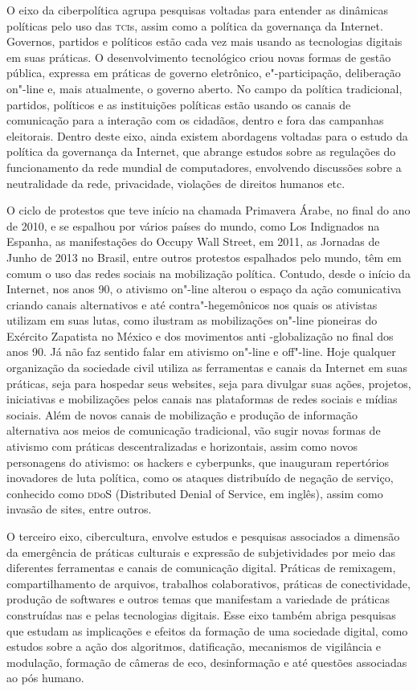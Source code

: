 O eixo da ciberpolítica agrupa pesquisas voltadas para entender as
dinâmicas políticas pelo uso das \textsc{tci}s, assim como a política da
governança da Internet. Governos, partidos e políticos estão cada vez
mais usando as tecnologias digitais em suas práticas. O desenvolvimento
tecnológico criou novas formas de gestão pública, expressa em práticas
de governo eletrônico, e"-participação, deliberação on"-line e, mais
atualmente, o governo aberto. No campo da política tradicional,
partidos, políticos e as instituições políticas estão usando os canais
de comunicação para a interação com os cidadãos, dentro e fora das
campanhas eleitorais. Dentro deste eixo, ainda existem abordagens
voltadas para o estudo da política da governança da Internet, que
abrange estudos sobre as regulações do funcionamento da rede mundial de
computadores, envolvendo discussões sobre a neutralidade da rede,
privacidade, violações de direitos humanos etc.

O ciclo de protestos que teve início na chamada Primavera Árabe, no
final do ano de 2010, e se espalhou por vários países do mundo, como Los
Indignados na Espanha, as manifestações do Occupy Wall Street, em 2011,
as Jornadas de Junho de 2013 no Brasil, entre outros protestos
espalhados pelo mundo, têm em comum o uso das redes sociais na
mobilização política. Contudo, desde o início da Internet, nos anos 90,
o ativismo on"-line alterou o espaço da ação comunicativa criando canais
alternativos e até contra"-hegemônicos nos quais os ativistas utilizam em
suas lutas, como ilustram as mobilizações on"-line pioneiras do Exército
Zapatista no México e dos movimentos anti -globalização no final dos
anos 90. Já não faz sentido falar em ativismo on"-line e off"-line. Hoje
qualquer organização da sociedade civil utiliza as ferramentas e canais
da Internet em suas práticas, seja para hospedar seus websites, seja
para divulgar suas ações, projetos, iniciativas e mobilizações pelos
canais nas plataformas de redes sociais e mídias sociais. Além de novos
canais de mobilização e produção de informação alternativa aos meios de
comunicação tradicional, vão sugir novas formas de ativismo com práticas
descentralizadas e horizontais, assim como novos personagens do
ativismo: os hackers e cyberpunks, que inauguram repertórios inovadores
de luta política, como os ataques distribuído de negação de serviço,
conhecido como \textsc{dd}oS (Distributed Denial of Service, em inglês), assim
como invasão de sites, entre outros.

O terceiro eixo, cibercultura, envolve estudos e pesquisas associados a
dimensão da emergência de práticas culturais e expressão de
subjetividades por meio das diferentes ferramentas e canais de
comunicação digital. Práticas de remixagem, compartilhamento de
arquivos, trabalhos colaborativos, práticas de conectividade, produção
de softwares e outros temas que manifestam a variedade de práticas
construídas nas e pelas tecnologias digitais. Esse eixo também abriga
pesquisas que estudam as implicações e efeitos da formação de uma
sociedade digital, como estudos sobre a ação dos algoritmos,
datificação, mecanismos de vigilância e modulação, formação de câmeras
de eco, desinformação e até questões associadas ao pós humano.

